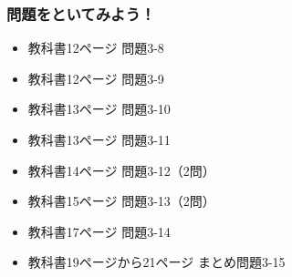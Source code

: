 \begin{frame}
    \frametitle{問題をといてみよう！}
    \begin{itemize}
        \item 教科書12ページ 問題3-8
        \item 教科書12ページ 問題3-9
        \item 教科書13ページ 問題3-10
        \item 教科書13ページ 問題3-11
        \item 教科書14ページ 問題3-12（2問）
        \item 教科書15ページ 問題3-13（2問）
        \item 教科書17ページ 問題3-14
        \item 教科書19ページから21ページ まとめ問題3-15
    \end{itemize}
\end{frame}
